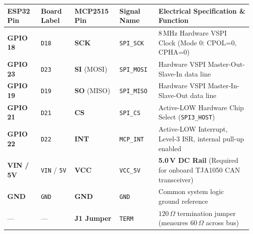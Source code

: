 \documentclass[10pt,a4paper]{article}
\begin{document}
\begin{tcolorbox}[bwcard, title={1. Classic ESP32 (esp32dev) to MCP2515 SPI Module (High CAN)}]
\begin{tabularx}{\textwidth}{@{} C{1.8cm} C{1.5cm} C{1.8cm} C{1.8cm} Y @{}}
\toprule
\textbf{ESP32 Pin} & \textbf{Board Label} & \textbf{MCP2515 Pin} & \textbf{Signal Name} & \textbf{Electrical Specification \& Function} \\
\midrule
\textbf{GPIO 18} & \texttt{D18} & \textbf{SCK} & \texttt{SPI\_SCK} & 8\,MHz Hardware VSPI Clock (Mode 0: CPOL=0, CPHA=0) \\
\textbf{GPIO 23} & \texttt{D23} & \textbf{SI} (MOSI) & \texttt{SPI\_MOSI} & Hardware VSPI Master-Out-Slave-In data line \\
\textbf{GPIO 19} & \texttt{D19} & \textbf{SO} (MISO) & \texttt{SPI\_MISO} & Hardware VSPI Master-In-Slave-Out data line \\
\textbf{GPIO 21} & \texttt{D21} & \textbf{CS} & \texttt{SPI\_CS} & Active-LOW Hardware Chip Select (\texttt{SPI3\_HOST}) \\
\textbf{GPIO 22} & \texttt{D22} & \textbf{INT} & \texttt{MCP\_INT} & Active-LOW Interrupt, Level-3 ISR, internal pull-up enabled \\
\textbf{VIN / 5V} & \texttt{VIN} / \texttt{5V} & \textbf{VCC} & \texttt{VCC\_5V} & \textbf{5.0\,V DC Rail} (Required for onboard TJA1050 CAN transceiver) \\
\textbf{GND} & \texttt{GND} & \textbf{GND} & \texttt{GND} & Common system logic ground reference \\
— & — & \textbf{J1 Jumper} & \texttt{TERM} & $120\,\Omega$ termination jumper (measures $60\,\Omega$ across bus) \\
\bottomrule
\end{tabularx}
\end{tcolorbox}

\vspace{-8pt}
\end{document}
